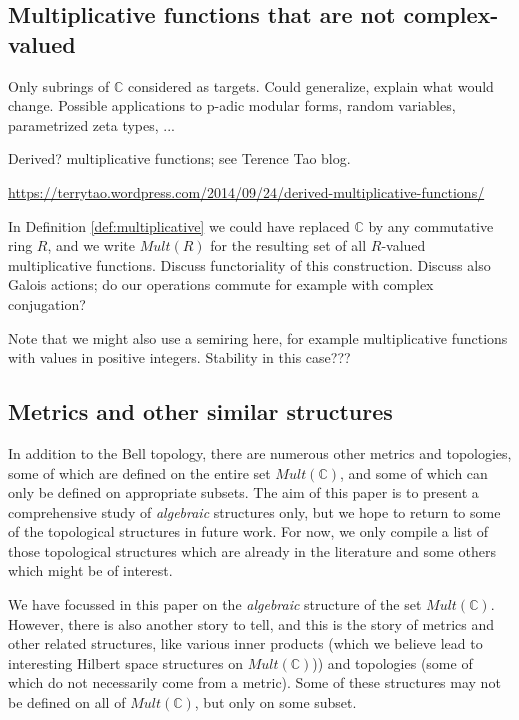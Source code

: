 \documentclass[a4paper]{article}
\theoremstyle{definition}
\theoremstyle{remark}
\newcommand{\C}{\mathbb{C}}
\begin{document}
\subsection{Multiplicative functions that are not complex-valued}

Only subrings of $\mathbb{C}$ considered as targets. Could generalize, explain what would change. Possible applications to p-adic modular forms, random variables, parametrized zeta types, ...


Derived? multiplicative functions; see Terence Tao blog.

\url{https://terrytao.wordpress.com/2014/09/24/derived-multiplicative-functions/}



In Definition \ref{def:multiplicative} we could have replaced $\mathbb{C}$ by any commutative ring $R$, and we write $Mult(R)$ for the resulting set of all $R$-valued multiplicative functions. Discuss functoriality of this construction. Discuss also Galois actions; do our operations commute for example with complex conjugation? 

Note that we might also use a semiring here, for example multiplicative functions with values in positive integers. Stability in this case???











\subsection{Metrics and other similar structures}

In addition to the Bell topology, there are numerous other metrics and topologies, some of which are defined on the entire set $Mult(\C)$, and some of which can only be defined on appropriate subsets. The aim of this paper is to present a comprehensive study of \emph{algebraic} structures only, but we hope to return to some of the topological structures in future work. For now, we only compile a list of those topological structures which are already in the literature and some others which might be of interest.



We have focussed in this paper on the \emph{algebraic} structure of the set $Mult(\C)$. However, there is also another story to tell, and this is the story of metrics and other related structures, like various inner products (which we believe lead to interesting Hilbert space structures on $Mult(\C)$)) and topologies (some of which do not necessarily come from a metric). Some of these structures may not be defined on all of $Mult(\C)$, but only on some subset.
\end{document}
